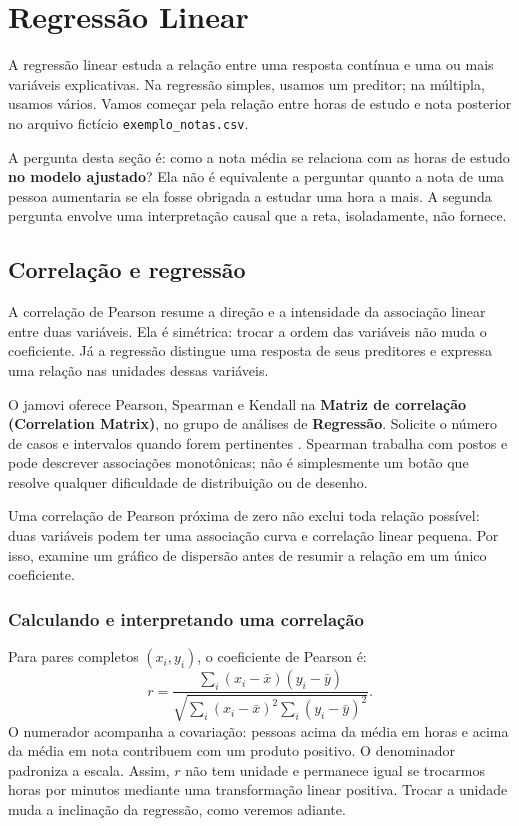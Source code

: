 \chapter{Regressão Linear}
\label{cap:regressao}

A regressão linear estuda a relação entre uma resposta contínua e uma ou mais variáveis explicativas. Na regressão simples, usamos um preditor; na múltipla, usamos vários. Vamos começar pela relação entre horas de estudo e nota posterior no arquivo fictício \texttt{exemplo\_notas.csv}.

A pergunta desta seção é: como a nota média se relaciona com as horas de estudo \textbf{no modelo ajustado}? Ela não é equivalente a perguntar quanto a nota de uma pessoa aumentaria se ela fosse obrigada a estudar uma hora a mais. A segunda pergunta envolve uma interpretação causal que a reta, isoladamente, não fornece.

\section{Correlação e regressão}

A correlação de Pearson resume a direção e a intensidade da associação linear entre duas variáveis. Ela é simétrica: trocar a ordem das variáveis não muda o coeficiente. Já a regressão distingue uma resposta de seus preditores e expressa uma relação nas unidades dessas variáveis.

O jamovi oferece Pearson, Spearman e Kendall na \textbf{Matriz de correlação (Correlation Matrix)}, no grupo de análises de \textbf{Regressão}. Solicite o número de casos e intervalos quando forem pertinentes \parencite{JamoviCorrelacao}. Spearman trabalha com postos e pode descrever associações monotônicas; não é simplesmente um botão que resolve qualquer dificuldade de distribuição ou de desenho.

Uma correlação de Pearson próxima de zero não exclui toda relação possível: duas variáveis podem ter uma associação curva e correlação linear pequena. Por isso, examine um gráfico de dispersão antes de resumir a relação em um único coeficiente.

\subsection{Calculando e interpretando uma correlação}

Para pares completos $(x_i,y_i)$, o coeficiente de Pearson é:
\[
r=\frac{\sum_i(x_i-\bar x)(y_i-\bar y)}
{\sqrt{\sum_i(x_i-\bar x)^2\sum_i(y_i-\bar y)^2}}.
\]
O numerador acompanha a covariação: pessoas acima da média em horas e acima da média em nota contribuem com um produto positivo. O denominador padroniza a escala. Assim, $r$ não tem unidade e permanece igual se trocarmos horas por minutos mediante uma transformação linear positiva. Trocar a unidade muda a inclinação da regressão, como veremos adiante.

